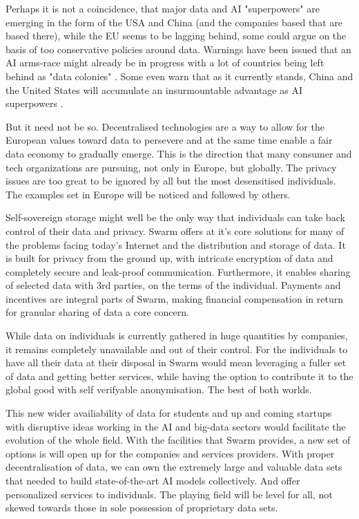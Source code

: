 Perhaps it is not a coincidence, that major data and AI "superpowers" are emerging in the form of the USA and China (and the companies based that are based there), while the EU seems to be lagging behind, some could argue on the basis of too conservative policies around data. Warnings have been issued that an AI arms-race might already be in progress with a lot of countries being left behind as "data colonies" \cite{HarariDavos2020Mar}. Some even warn that as it currently stands, China and the United States will accumulate an insurmountable advantage as AI superpowers \cite{Lee2018Sep}.

But it need not be so. Decentralised technologies are a way to allow for the European values toward data to persevere and at the same time enable a fair data economy to gradually emerge. This is the direction that many consumer and tech organizations are pursuing, not only in Europe, but globally. The privacy issues are too great to be ignored by all but the most desensitised individuals. The examples set in Europe will be noticed and followed by others.

Self-sovereign storage might well be the only way that individuals can take back control of their data and privacy. Swarm offers at it's core solutions for many of the problems facing today's Internet and the distribution and storage of data. It is built for privacy from the ground up, with intricate encryption of data and completely secure and leak-proof communication. Furthermore, it enables sharing of selected data with 3rd parties, on the terms of the individual. Payments and incentives are integral parts of Swarm, making financial compensation   in return for granular sharing of data a core concern.

While data on individuals is currently gathered in huge quantities by companies, it remains completely unavailable and out of their control. For the individuals to have all their data at their disposal in Swarm would mean leveraging a fuller set of data and getting better services, while having the option to contribute it to the global good with self verifyable anonymisation. The best of both worlds.

This new wider availiability of data for students and up and coming startups with disruptive ideas working in the AI and big-data sectors would facilitate the evolution of the whole field. With the facilities that Swarm provides, a new set of options is will open up for the companies and services providers. With proper decentralisation of data, we can own the extremely large and valuable data sets  that needed to build state-of-the-art AI models collectively. And offer personalized services to individuals. The playing field will be level for all, not skewed towards those in sole possession of proprietary data sets. 




